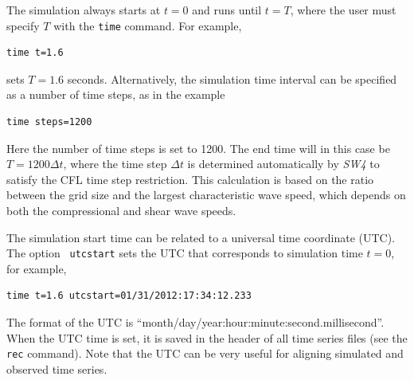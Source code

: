 \documentclass[11pt]{report}
\begin{document}
The simulation always starts at $t=0$ and runs until $t=T$, where the user must specify $T$ with the
{\tt time} command. For example,
\begin{verbatim}
time t=1.6
\end{verbatim}
sets $T=1.6$ seconds. Alternatively, the simulation time interval can be specified as 
a number of time steps, as in the example
\begin{verbatim}
time steps=1200
\end{verbatim}
Here the number of time steps is set to 1200. The end time will in this case be $T=1200\Delta t$,
where the time step $\Delta t$ is determined automatically by \emph{SW4} to satisfy the CFL time
step restriction. This calculation is based on the ratio between the grid size and the largest
characteristic wave speed, which depends on both the compressional and shear wave speeds. 

The simulation start time can be related to a universal time coordinate (UTC). The option {\tt
  utcstart} sets the UTC that corresponds to simulation time $t=0$, for example,
\begin{verbatim}
time t=1.6 utcstart=01/31/2012:17:34:12.233
\end{verbatim}
The format of the UTC is ``month/day/year:hour:minute:second.millisecond''. When the UTC time
is set, it is saved in the header of all time series files (see the {\tt rec} command). Note that
the UTC can be very useful for aligning simulated and observed time series.
\end{document}
